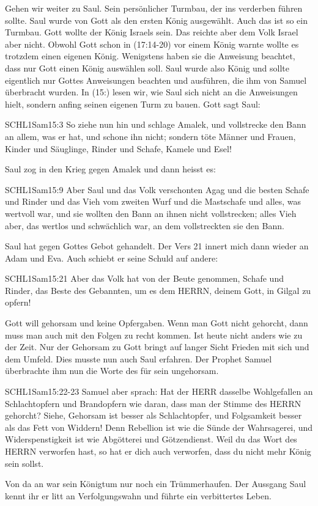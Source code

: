 \documentclass[14pt]{../../inc/mybib}
\newenvironment{block}[1][]{%
  \vspace{1.5em}%
  \noindent\textbf{#1}\par%
  \vspace{0.0em}%
}{%
  \vspace{1em}%
}
\begin{document}
\begin{block}
    Gehen wir weiter zu Saul. Sein persönlicher Turmbau, der ins verderben führen sollte. Saul wurde von Gott als den ersten König ausgewählt. Auch das ist so ein Turmbau. Gott wollte der König Israels sein. Das reichte aber dem Volk Israel aber nicht. Obwohl Gott schon in (17:14-20) vor einem König warnte wollte es trotzdem einen eigenen König. Wenigstens haben sie die Anweisung beachtet, dass nur Gott einen König auswählen soll. Saul wurde also König und sollte eigentlich nur Gottes Anweisungen beachten und ausführen, die ihm von Samuel überbracht wurden. In (15:) lesen wir, wie Saul sich nicht an die Anweisungen hielt, sondern anfing seinen eigenen Turm zu bauen. Gott sagt Saul:
    \begin{bibelbox}{SCHL}{1Sam}{15:3}
        So ziehe nun hin und schlage Amalek, und vollstrecke den Bann an allem, was er hat, und schone ihn nicht; sondern töte Männer und Frauen, Kinder und Säuglinge, Rinder und Schafe, Kamele und Esel!
    \end{bibelbox}
    Saul zog in den Krieg gegen Amalek und dann heisst es:
    \begin{bibelbox}{SCHL}{1Sam}{15:9}
        Aber Saul und das Volk verschonten Agag und die besten Schafe und Rinder und das Vieh vom zweiten Wurf und die Mastschafe und alles, was wertvoll war, und sie wollten den Bann an ihnen nicht vollstrecken; alles Vieh aber, das wertlos und schwächlich war, an dem vollstreckten sie den Bann.
    \end{bibelbox}
    Saul hat gegen Gottes Gebot gehandelt. Der Vers 21 innert mich dann wieder an Adam und Eva. Auch schiebt er seine Schuld auf andere:
    \begin{bibelbox}{SCHL}{1Sam}{15:21}
        Aber das Volk hat von der Beute genommen, Schafe und Rinder, das Beste des Gebannten, um es dem HERRN, deinem Gott, in Gilgal zu opfern!
    \end{bibelbox}
    Gott will gehorsam und keine Opfergaben. Wenn man Gott nicht gehorcht, dann muss man auch mit den Folgen zu recht kommen. Ist heute nicht anders wie zu der Zeit. Nur der Gehorsam zu Gott bringt auf langer Sicht Frieden mit sich und dem Umfeld. Dies musste nun auch Saul erfahren. Der Prophet Samuel überbrachte ihm nun die Worte des \herr für sein ungehorsam.    
    \begin{bibelbox}{SCHL}{1Sam}{15:22-23}
        Samuel aber sprach: Hat der HERR dasselbe Wohlgefallen an Schlachtopfern und Brandopfern wie daran, dass man der Stimme des HERRN gehorcht? Siehe, Gehorsam ist besser als Schlachtopfer, und Folgsamkeit besser als das Fett von Widdern! Denn Rebellion ist wie die Sünde der Wahrsagerei, und Widerspenstigkeit ist wie Abgötterei und Götzendienst. Weil du das Wort des HERRN verworfen hast, so hat er dich auch verworfen, dass du nicht mehr König sein sollst.
    \end{bibelbox} 
    Von da an war sein Königtum nur noch ein Trümmerhaufen. Der Aussgang Saul kennt ihr er litt an Verfolgungswahn und führte ein verbittertes Leben.
\end{block}
\end{document}
